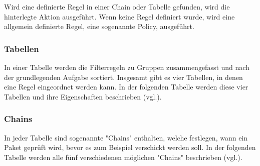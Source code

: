 \documentclass[
a4paper,     %
 headsepline, %
footsepline, %
titlepage,   %
 halfparskip,     %
 fleqn,       %
12pt         %
]{scrartcl}  %
\begin{document}
Wird eine definierte Regel in einer Chain oder Tabelle gefunden, wird die hinterlegte Aktion ausgeführt. Wenn keine Regel definiert wurde, wird eine allgemein definierte Regel, eine sogenannte Policy, ausgeführt.

\subsubsection{Tabellen}
In einer Tabelle werden die Filterregeln zu Gruppen zusammengefasst und nach der grundlegenden Aufgabe sortiert. Insgesamt gibt es vier Tabellen, in denen eine Regel eingeordnet werden kann. In der folgenden Tabelle werden diese vier Tabellen und ihre Eigenschaften beschrieben (vgl.\cite{iptables-1}). 

\begin{table}[!h]
\centering
{}
\caption{IP-Tables: Tabellen}
\label{Tables: Tabellen}
\end{table}
 
\subsubsection{Chains}
In jeder Tabelle sind sogenannte "Chains" enthalten, welche festlegen, wann ein Paket geprüft wird, bevor es zum Beispiel verschickt werden soll. In der folgenden Tabelle werden alle fünf verschiedenen möglichen "Chains" beschrieben (vgl.\cite{iptables-1}). 
\end{document}
